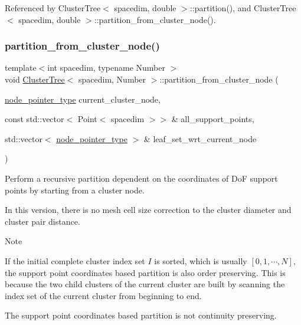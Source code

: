 Referenced by Cluster\+Tree$<$ spacedim, double $>$\+::partition(), and Cluster\+Tree$<$ spacedim, double $>$\+::partition\+\_\+from\+\_\+cluster\+\_\+node().

\mbox{\label{classClusterTree_a6d3636b1686d72909611a6d516f5ee47}} 
\subsubsection{\texorpdfstring{partition\+\_\+from\+\_\+cluster\+\_\+node()}{partition\_from\_cluster\_node()}\hspace{0.1cm}{\footnotesize\ttfamily [2/3]}}
{\footnotesize\ttfamily template$<$int spacedim, typename Number $>$ \\
void \hyperlink{classClusterTree}{Cluster\+Tree}$<$ spacedim, Number $>$\+::partition\+\_\+from\+\_\+cluster\+\_\+node (\begin{DoxyParamCaption}\item[{\hyperlink{classClusterTree_ae4bb0fdc7ac559d7844d04a00ab3e9de}{node\+\_\+pointer\+\_\+type}}]{current\+\_\+cluster\+\_\+node,  }\item[{const std\+::vector$<$ Point$<$ spacedim $>$$>$ \&}]{all\+\_\+support\+\_\+points,  }\item[{std\+::vector$<$ \hyperlink{classClusterTree_ae4bb0fdc7ac559d7844d04a00ab3e9de}{node\+\_\+pointer\+\_\+type} $>$ \&}]{leaf\+\_\+set\+\_\+wrt\+\_\+current\+\_\+node }\end{DoxyParamCaption})\hspace{0.3cm}{\ttfamily [private]}}

Perform a recursive partition dependent on the coordinates of DoF support points by starting from a cluster node.

In this version, there is no mesh cell size correction to the cluster diameter and cluster pair distance.


\begin{DoxyDescription}
\item[Note ]
\begin{DoxyEnumerate}
\item If the initial complete cluster index set $I$ is sorted, which is usually $[0, 1, \cdots, N]$, the support point coordinates based partition is also order preserving. This is because the two child clusters of the current cluster are built by scanning the index set of the current cluster from beginning to end.
\item The support point coordinates based partition is not continuity preserving.  
\end{DoxyEnumerate}
\end{DoxyDescription}


